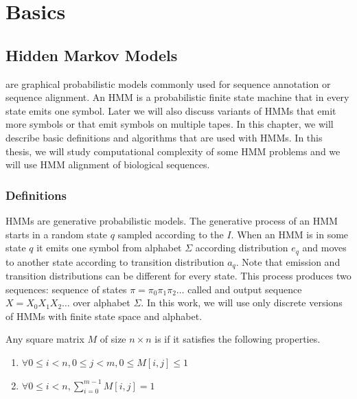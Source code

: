 \chapter{Basics}
\label{CHAPTER:BASICS}

\section{Hidden Markov Models}
 are graphical probabilistic models
commonly used for sequence annotation or sequence alignment. An HMM is a
probabilistic finite state machine that in every state emits one symbol. Later
we will also discuss variants of HMMs that emit more symbols or that emit
symbols on multiple tapes. In this chapter, we will describe basic definitions
and algorithms that are used with HMMs. In this thesis, we will study computational complexity of some HMM problems and we will use HMM alignment of biological sequences.

\subsection{Definitions}\label{SECTION:HMMDEF}
                       
HMMs are generative probabilistic models.
The generative process of an HMM starts in a random state $q$ sampled according
to the  $I$.  When an HMM is in some state $q$ it emits one symbol from
alphabet $\Sigma$ according distribution $e_q$ and moves to another state
according to transition distribution $a_q$. Note that emission and transition
distributions can be different for every state.  This process produces two
sequences: sequence of states $\pi=\pi_0\pi_1\pi_2\dots$ called
 and output sequence $X=X_0X_1X_2\dots$ over alphabet
$\Sigma$. In this work, we will use only discrete versions of HMMs with finite state
space and alphabet.  


\begin{definition}
Any square matrix $M$ of size $n\times n$ is  if it satisfies the
following properties.
\begin{enumerate}
\item $\forall 0\leq i<n,0\leq j < m, 0\leq M[i,j]\leq 1$
\item $\forall 0\le i<n, \sum_{i=0}^{m-1}M[i,j]=1$
\end{enumerate}
\end{definition}

